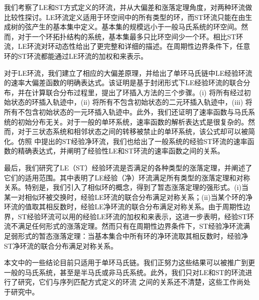 我们考察了LE和ST方式定义的环流，并从大偏差和涨落定理角度，对两种环流做比较性探讨。LE环流定义适用于环空间中的所有类型的环，而ST环流只能在由生成树的弦产生的基本集中定义。基本集的规模远小于一般马氏系统的环空间。然而，对于一个环拓扑结构的系统，基本集最多只比环空间少一个环。相比ST环流，LE环流对环动态性给出了更完整和详细的描述。在周期性边界条件下，任意环的ST环流都能通过LE环流的加权和来表示。

对于LE环流，我们建立了相应的大偏差原理，并给出了单环马氏链中LE经验环流的速率大偏差函数的明确表达式。该证明是基于封闭形式下LE经验环流的联合分布，并在计算联合分布过程里，提出了环插入方法的三个步骤。(i) 将所有经过初始状态的环插入轨迹中，(ii) 将所有不包含初始状态的二元环插入轨迹中，(iii) 将所有不包含初始状态的一元环插入轨迹中。此外，我们还证明了速率函数与马氏系统的初始分布无关。对于一般的单环系统，速率函数的解析表达式是很复杂的。然而，对于三状态系统和相邻状态之间的转移被禁止的单环系统，该公式却可以被简化。仿照 \cite{bertini2015flows} 中提出的ST经验净环流，我们也给出了一般系统的经验ST环流的速率函数的精确表达式，并阐明了经验性LE和ST环流的速率函数之间的关系。

最后，我们研究了LE（ST）经验环流是否满足的各种类型的涨落定理，并阐述了它们的适用范围。其中表明了LE经验（净）环流满足所有类型的涨落定理和对称关系。特别是，我们引入了相似环的概念，得到了暂态涨落定理的强形式。(i)当某一对相似环被交换时，经验LE环流的联合分布满足对称关系；(ii)当某个环的净环流的值取其相反数时，经验LE净环流的联合分布满足对称关系。由于周期性边界，ST经验环流可以用的经验LE环流的加权和来表示，这进一步表明，经验ST环流不满足任何形式的涨落定理。然而只有在周期性边界条件下，ST经验净环流满足弱形式的暂态涨落定理：当基本集合中所有环的净环流取其相反数时，经验净ST净环流的联合分布满足对称关系。

本文中的一些结论目前只适用于单环马氏链。我们正努力这些结果可以被推广到更一般的马氏系统，甚至是半马氏或非马氏系统。此外，我们只对LE和ST的环流进行了研究，它们与序列匹配方式定义的环流 \cite{roldan2019exact,biddle2020reversal,pietzonka2021cycle} 之间的关系还不清楚，这些工作尚处于研究中。